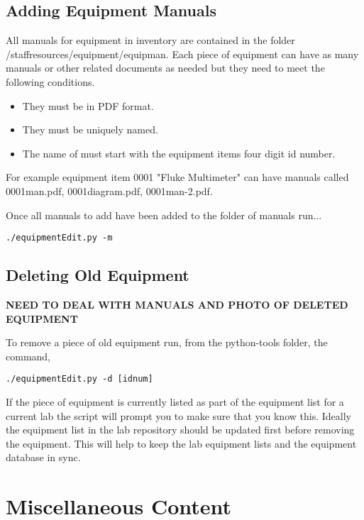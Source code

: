 \documentclass[justified]{pjlProcessDocs}
\begin{document}
\section{Adding Equipment Manuals}

All manuals for equipment in inventory are contained in the folder /staffresources/equipment/equipman. Each piece of equipment can have as many manuals or other related documents as needed but they need to meet the following conditions.

\begin{itemize}
\item They must be in PDF format.
\item They must be uniquely named.
\item The name of must start with the equipment items four digit id number.

\end{itemize}

For example equipment item 0001 "Fluke Multimeter" can have manuals called 0001man.pdf, 0001diagram.pdf, 0001man-2.pdf. 

Once all manuals to add have been added to the folder of manuals run...

\begin{lstlisting}
./equipmentEdit.py -m
\end{lstlisting}

\section{Deleting Old Equipment}

{\bf NEED TO DEAL WITH MANUALS AND PHOTO OF DELETED EQUIPMENT}

To remove a piece of old equipment run, from the python-tools folder, the command,


\begin{lstlisting}
./equipmentEdit.py -d [idnum]       
\end{lstlisting}

If the piece of equipment is currently listed as part of the equipment list for a current lab the script will prompt you to make sure that you know this. Ideally the equipment list in the lab repository should be updated first before removing the equipment. This will help to keep the lab equipment lists and the equipment database in sync. 

\chapter{Miscellaneous Content}\label{chap:misc}
\end{document}
